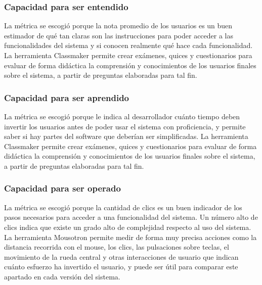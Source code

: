\documentclass[12pt]{article}
\begin{document}
\subsubsection{Capacidad para ser entendido }
\vspace*{0.1in}
La métrica se escogió porque la nota promedio de los usuarios es un buen estimador de qué tan claras son las instrucciones para poder acceder a las funcionalidades del sistema y si conocen realmente qué hace cada funcionalidad. La herramienta Classmaker permite crear exámenes, quices y cuestionarios para evaluar de forma didáctica la comprensión y conocimientos de los usuarios finales sobre el sistema, a partir de preguntas elaboradas para tal fin.
\vspace*{0.3in}
\subsubsection{Capacidad para ser aprendido}
\vspace*{0.1in}
La métrica se escogió porque le indica al desarrollador cuánto tiempo deben invertir los usuarios antes de poder usar el sistema con proficiencia, y permite saber si hay partes del software que deberían ser simplificadas. La herramienta Classmaker permite crear exámenes, quices y cuestionarios para evaluar de forma didáctica la comprensión y conocimientos de los usuarios finales sobre el sistema, a partir de preguntas elaboradas para tal fin.
\vspace*{0.3in}
\subsubsection{Capacidad para ser operado}
\vspace*{0.1in}
La métrica se escogió porque la cantidad de clics es un buen indicador de los pasos necesarios para acceder a una funcionalidad del sistema. Un número alto de clics indica que existe un grado alto de complejidad respecto al uso del sistema. La herramienta Mousotron permite medir de forma muy precisa acciones como la distancia recorrida con el mouse, los clics, las pulsaciones sobre teclas, el movimiento de la rueda central y otras interacciones de usuario que indican cuánto esfuerzo ha invertido el usuario, y puede ser útil para comparar este apartado en cada versión del sistema.

\vspace*{0.3in}
\end{document}
